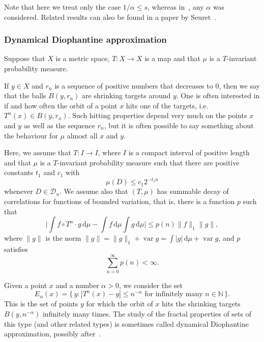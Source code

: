 \documentclass[11pt]{article}
\theoremstyle{definition}
\numberwithin{equation}{section}
\numberwithin{figure}{section}
\numberwithin{table}{section}
\DeclareMathOperator{\var}{var}
\newcommand*{\dd}{\mathrm{d}}
\begin{document}
Note that here we treat only the case $1/\alpha \leq s$, whereas in~\cite{ekstrompersson}, any $\alpha$ was considered. Related results can also be found in a paper by Seuret~\cite{seuret}.

\subsubsection{Dynamical Diophantine approximation} \label{sec:shrinking}

Suppose that $X$ is a metric space, $T \colon X \to X$ is a map and that $\mu$ is a $T$-invariant probability measure.

If $y \in X$ and $r_n$ is a sequence of positive numbers that decreases to 0, then we say that the balls $B(y, r_n)$ are shrinking targets around $y$. One is often interested in if and how often the orbit of a point $x$ hits one of the targets, i.e.\ $T^n (x) \in B (y, r_n)$. Such hitting properties depend very much on the points $x$ and $y$ as well as the sequence $r_n$, but it is often possible to say something about the behaviour for $\mu$ almost all $x$ and $y$.

Here, we assume that $T \colon I \to I$, where $I$ is a compact interval of positive length and that $\mu$ is a $T$-invariant probability measure such that there are positive constants $t_1$ and $c_1$ with
\begin{equation}\label{eq:measuredecay}
\mu (D) \leq c_1 2^{-t_1 n}
\end{equation}
whenever $D \in \mathscr{D}_n$. We assume also that $(T,\mu)$ has summable decay of correlations for functions of bounded variation, that is, there is a function $p$ such that
\begin{equation}\label{eq:decay}
\biggl| \int f \circ T^n \cdot g \, \dd \mu - \int f \,
\dd \mu \int g \, \dd\mu \biggr| \leq p(n) \lVert f
\rVert_1 \lVert g \rVert,
\end{equation}
where $\lVert g \rVert$ is the norm $\lVert g \rVert = \lVert g
\rVert_1 + \var g = \int |g| \, \dd \mu + \var g$, and $p$ satisfies
\[
\sum_{n=0}^\infty p(n) < \infty.
\]

Given a point $x$ and a number $\alpha > 0$, we consider the set
\[
E_\alpha (x) = \{\, y : |T^n (x) - y| \leq n^{-\alpha} \text{ for infinitely many } n \in \mathbb{N} \,\}.
\]
This is the set of points $y$ for which the orbit of $x$ hits the shrinking targets $B(y,n^{-\alpha})$ infinitely many times. The study of the fractal properties of sets of this type (and other related types) is sometimes called dynamical Diophantine approximation, possibly after~\cite{fanschmelingtroubetzkoy}.
\end{document}
